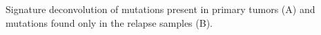 Signature deconvolution of mutations present in primary tumors (A) and mutations found only in the relapse samples (B).